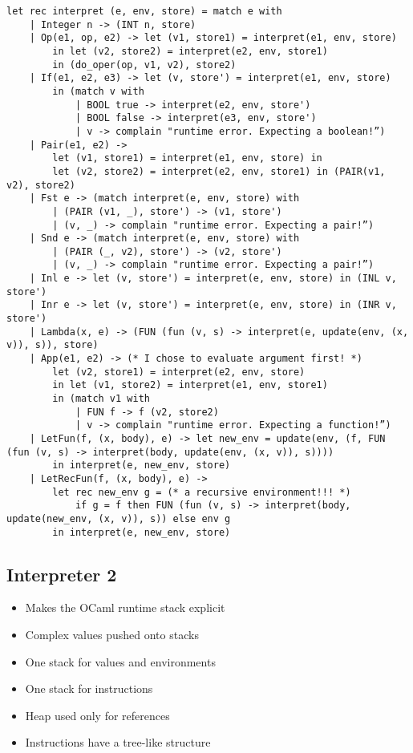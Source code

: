 \documentclass{article}
\begin{document}
\begin{lstlisting}
let rec interpret (e, env, store) = match e with
	| Integer n -> (INT n, store) 
	| Op(e1, op, e2) -> let (v1, store1) = interpret(e1, env, store) 
		in let (v2, store2) = interpret(e2, env, store1) 
		in (do_oper(op, v1, v2), store2)
	| If(e1, e2, e3) -> let (v, store') = interpret(e1, env, store) 
		in (match v with
			| BOOL true -> interpret(e2, env, store')
			| BOOL false -> interpret(e3, env, store')
			| v -> complain "runtime error. Expecting a boolean!”)
	| Pair(e1, e2) ->
		let (v1, store1) = interpret(e1, env, store) in
		let (v2, store2) = interpret(e2, env, store1) in (PAIR(v1, v2), store2)
	| Fst e -> (match interpret(e, env, store) with
		| (PAIR (v1, _), store') -> (v1, store')
		| (v, _) -> complain "runtime error. Expecting a pair!”)
	| Snd e -> (match interpret(e, env, store) with
		| (PAIR (_, v2), store') -> (v2, store')
		| (v, _) -> complain "runtime error. Expecting a pair!”)
	| Inl e -> let (v, store') = interpret(e, env, store) in (INL v, store')
	| Inr e -> let (v, store') = interpret(e, env, store) in (INR v, store')
	| Lambda(x, e) -> (FUN (fun (v, s) -> interpret(e, update(env, (x, v)), s)), store)
	| App(e1, e2) -> (* I chose to evaluate argument first! *)
		let (v2, store1) = interpret(e2, env, store) 
		in let (v1, store2) = interpret(e1, env, store1) 
		in (match v1 with
			| FUN f -> f (v2, store2)
			| v -> complain "runtime error. Expecting a function!”)
	| LetFun(f, (x, body), e) -> let new_env = update(env, (f, FUN (fun (v, s) -> interpret(body, update(env, (x, v)), s)))) 
		in interpret(e, new_env, store)
	| LetRecFun(f, (x, body), e) ->
		let rec new_env g = (* a recursive environment!!! *)
			if g = f then FUN (fun (v, s) -> interpret(body, update(new_env, (x, v)), s)) else env g
		in interpret(e, new_env, store)
\end{lstlisting}

\subsection{Interpreter 2}
\begin{itemize}
	\item Makes the OCaml runtime stack explicit
	\item Complex values pushed onto stacks
	\item One stack for values and environments
	\item One stack for instructions
	\item Heap used only for references
	\item Instructions have a tree-like structure
\end{itemize}
\end{document}
